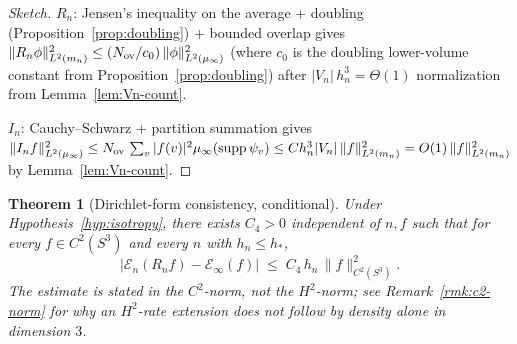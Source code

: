 \documentclass[11pt, a4paper]{amsart}
\newtheorem{theorem}{Theorem}[section]
\theoremstyle{definition}
\newcommand{\supp}{\operatorname{supp}}
\begin{document}
\begin{proof}[Sketch]
$R_n$: Jensen's inequality on the average + doubling
(Proposition~\ref{prop:doubling}) + bounded overlap gives
$\|R_n \phi\|_{L^2(m_n)}^2 \leq (N_{\rm ov}/c_0)\,\|\phi\|_{L^2(\mu_\infty)}^2$
(where $c_0$ is the doubling lower-volume constant from
Proposition~\ref{prop:doubling})
after $|V_n|\,h_n^3 = \Theta(1)$ normalization from
Lemma~\ref{lem:Vn-count}.

$I_n$: Cauchy--Schwarz + partition summation gives $\|I_n
f\|_{L^2(\mu_\infty)}^2 \leq N_{\rm ov}\,\sum_v |f(v)|^2
\mu_\infty(\supp \psi_v) \leq C h_n^3 |V_n|\,\|f\|_{L^2(m_n)}^2
= O(1)\,\|f\|_{L^2(m_n)}^2$ by Lemma~\ref{lem:Vn-count}.
\end{proof}

\begin{theorem}[Dirichlet-form consistency, conditional]
\label{thm:form-consistency}
Under Hypothesis~\ref{hyp:isotropy}, there exists $C_4 > 0$
independent of $n, f$ such that for every $f \in C^2(S^3)$ and
every $n$ with $h_n \leq h_\ast$,
\[
  \bigl|\mathcal E_n(R_n f) - \mathcal E_\infty(f)\bigr|
    \;\leq\; C_4\,h_n\,\|f\|_{C^2(S^3)}^2.
\]
The estimate is stated in the $C^2$-norm, not the $H^2$-norm;
see Remark~\ref{rmk:c2-norm} for why an $H^2$-rate extension
does not follow by density alone in dimension $3$.
\end{theorem}
\end{document}
